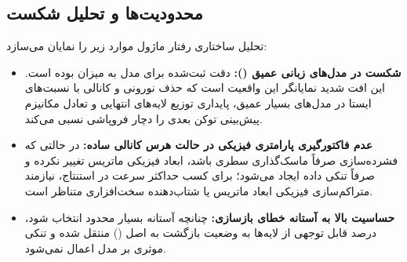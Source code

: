 \subsection{محدودیت‌ها و تحلیل شکست}
تحلیل ساختاری رفتار ماژول موارد زیر را نمایان می‌سازد:
\begin{itemize}
    \item \textbf{شکست در مدل‌های زبانی عمیق ():} دقت ثبت‌شده برای مدل  به میزان  بوده است. این افت شدید نمایانگر این واقعیت است که حذف نورونی و کانالی با نسبت‌های ایستا در مدل‌های بسیار عمیق، پایداری توزیع لایه‌های انتهایی و تعادل مکانیزم پیش‌بینی توکن بعدی را دچار فروپاشی نسبی می‌کند.
    \item \textbf{عدم فاکتورگیری پارامتری فیزیکی در حالت هرس کانالی ساده:} در حالتی که فشرده‌سازی صرفاً ماسک‌گذاری سطری باشد، ابعاد فیزیکی ماتریس تغییر نکرده و صرفاً تنکی داده ایجاد می‌شود؛ برای کسب حداکثر سرعت در استنتاج، نیازمند متراکم‌سازی فیزیکی ابعاد ماتریس یا شتاب‌دهنده سخت‌افزاری متناظر است.
    \item \textbf{حساسیت بالا به آستانه خطای بازسازی:} چنانچه آستانه  بسیار محدود انتخاب شود، درصد قابل توجهی از لایه‌ها به وضعیت بازگشت به اصل () منتقل شده و تنکی موثری بر مدل اعمال نمی‌شود.
\end{itemize}
